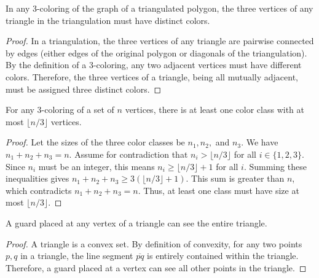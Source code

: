 \begin{lemma}
    \label{lem:Vertices_of_a_Triangle_in_a_3_Colored_Triangulation}
    In any 3-coloring of the graph of a triangulated polygon, the three vertices of any triangle in the triangulation must have distinct colors.
\end{lemma}
\begin{proof}
    In a triangulation, the three vertices of any triangle are pairwise connected by edges (either edges of the original polygon or diagonals of the triangulation). By the definition of a 3-coloring, any two adjacent vertices must have different colors. Therefore, the three vertices of a triangle, being all mutually adjacent, must be assigned three distinct colors.
\end{proof}

\begin{lemma}
    \label{lem:Existence_of_a_Small_Color_Class}
    For any 3-coloring of a set of $n$ vertices, there is at least one color class with at most $\lfloor n/3 \rfloor$ vertices.
\end{lemma}

\begin{proof}
    Let the sizes of the three color classes be $n_1, n_2,$ and $n_3$. We have $n_1 + n_2 + n_3 = n$. Assume for contradiction that $n_i > \lfloor n/3 \rfloor$ for all $i \in \{1, 2, 3\}$. Since $n_i$ must be an integer, this means $n_i \ge \lfloor n/3 \rfloor + 1$ for all $i$. Summing these inequalities gives $n_1 + n_2 + n_3 \ge 3(\lfloor n/3 \rfloor + 1)$. This sum is greater than $n$, which contradicts $n_1 + n_2 + n_3 = n$. Thus, at least one class must have size at most $\lfloor n/3 \rfloor$.
\end{proof}

\begin{lemma}
    \label{lem:Guards_on_Vertices_of_a_Triangle}
    A guard placed at any vertex of a triangle can see the entire triangle.
\end{lemma}

\begin{proof}
    A triangle is a convex set. By definition of convexity, for any two points $p, q$ in a triangle, the line segment $\overline{pq}$ is entirely contained within the triangle. Therefore, a guard placed at a vertex can see all other points in the triangle.
\end{proof}

